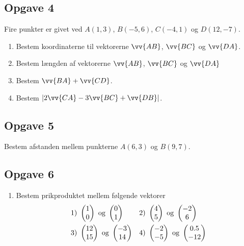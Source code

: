 \subsection*{Opgave 4}
Fire punkter er givet ved $A(1,3)$, $B(-5,6)$, $C(-4,1)$ og $D(12,-7)$.
\begin{enumerate}[label = \roman*)]
	\item Bestem koordinaterne til vektorerne $\vv{AB}$, $\vv{BC}$ og $\vv{DA}$.
	\item Bestem længden af vektorerne $\vv{AB}$, $\vv{BC}$ og $\vv{DA}$
	\item Bestem $\vv{BA} + \vv{CD}$.
	\item Bestem $|2\vv{CA} - 3\vv{BC} + \vv{DB}|$.
\end{enumerate}

\subsection*{Opgave 5}
Bestem afstanden mellem punkterne $A(6,3)$ og $B(9,7)$.


\subsection*{Opgave 6}
\begin{enumerate}[label=\roman*)]
\item Bestem prikproduktet mellem følgende vektorer
\begin{align*}
&1) \ \begin{pmatrix}1 \\ 0\end{pmatrix} \textnormal{ og } \begin{pmatrix}0 \\ 1\end{pmatrix}    &&2) \  \begin{pmatrix} 4 \\  5\end{pmatrix} \textnormal{ og } \begin{pmatrix} -2  \\ 6\end{pmatrix}    \\
&3) \ \begin{pmatrix}12 \\ 15\end{pmatrix} \textnormal{ og } \begin{pmatrix}-3 \\ 14 \end{pmatrix}   &&4) \ \begin{pmatrix} -2 \\ -5\end{pmatrix} \textnormal{ og } \begin{pmatrix} 0.5 \\ -12 \end{pmatrix}     \\
\end{align*}
\end{enumerate}

